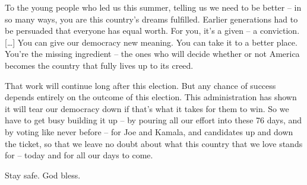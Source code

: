 \documentclass[10pt,a4paper]{article}
\begin{document}
To the young people who led us this summer, telling us we need to be better -- in so many ways, you are this country's dreams fulfilled. Earlier generations had to be persuaded that everyone has equal worth. For you, it's a given -- a conviction. […] You can give our democracy new meaning. You can take it to a better place. You're the missing ingredient -- the ones who will decide whether or not America becomes the country that fully lives up to its creed.

That work will continue long after this election. But any chance of success depends entirely on the outcome of this election. This administration has shown it will tear our democracy down if that's what it takes for them to win. So we have to get busy building it up -- by pouring all our effort into these 76 days, and by voting like never before -- for Joe and Kamala, and candidates up and down the ticket, so that we leave no doubt about what this country that we love stands for -- today and for all our days to come.

Stay safe. God bless.
\end{document}
